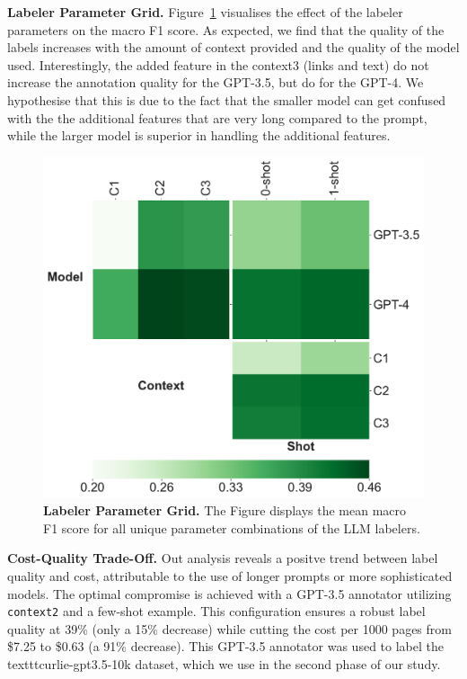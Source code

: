 \textbf{Labeler Parameter Grid.} Figure~\ref{fig:labelers-grid} visualises the effect of the labeler parameters on the macro F1 score. As expected, we find that the quality of the labels increases with the amount of context provided and the quality of the model used. Interestingly, the added feature in the context3 (links and text) do not increase the annotation quality for the GPT-3.5, but do for the GPT-4. We hypothesise that this is due to the fact that the smaller model can get confused with the the additional features that are very long compared to the prompt, while the larger model is superior in handling the additional features.

\begin{figure}[!h]
    \centering
    \includegraphics[width=.8\columnwidth]{figures/labeler-grid.pdf}
    \caption{\textbf{Labeler Parameter Grid.} The Figure displays the mean macro F1 score for all unique parameter combinations of the LLM labelers.}
    \label{fig:labelers-grid}
\end{figure}

\textbf{Cost-Quality Trade-Off.} 
Out analysis reveals a positve trend between label quality and cost, attributable to the use of longer prompts or more sophisticated models. The optimal compromise is achieved with a GPT-3.5 annotator utilizing \texttt{context2} and a few-shot example. This configuration ensures a robust label quality at 39\% (only a 15\% decrease) while cutting the cost per 1000 pages from \$7.25 to \$0.63 (a 91\% decrease). This GPT-3.5 annotator was used to label the texttt{curlie-gpt3.5-10k} dataset, which we use in the second phase of our study.

